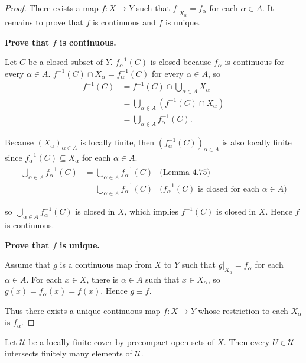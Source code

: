 \begin{proof}
	There exists a map $f: X\to Y$ such that $f\vert_{X_{\alpha}} = f_{\alpha}$ for each $\alpha\in A$. It remains to prove that $f$ is continuous and $f$ is unique.

	\textbf{Prove that $f$ is continuous.}

	Let $C$ be a closed subset of $Y$. $f_{\alpha}^{-1}(C)$ is closed  because $f_{\alpha}$ is continuous for every $\alpha\in A$. $f^{-1}(C) \cap X_{\alpha} = f_{\alpha}^{-1}(C)$ for every $\alpha\in A$, so
	\begin{align*}
		f^{-1}(C) & = f^{-1}(C) \cap \bigcup_{\alpha\in A}X_{\alpha}   \\
		          & = \bigcup_{\alpha\in A} (f^{-1}(C)\cap X_{\alpha}) \\
		          & = \bigcup_{\alpha\in A} f_{\alpha}^{-1}(C).
	\end{align*}

	Because ${(X_{\alpha})}_{\alpha\in A}$ is locally finite, then ${(f_{\alpha}^{-1}(C))}_{\alpha\in A}$ is also locally finite since $f_{\alpha}^{-1}(C) \subseteq X_{\alpha}$ for each $\alpha\in A$.
	\begin{align*}
		\overline{\bigcup_{\alpha\in A} f_{\alpha}^{-1}(C)} & = \bigcup_{\alpha\in A} \overline{f_{\alpha}^{-1}(C)} & \text{(Lemma 4.75)}                                            \\
		                                                    & = \bigcup_{\alpha\in A} f_{\alpha}^{-1}(C)            & \text{($f_{\alpha}^{-1}(C)$ is closed for each $\alpha\in A$)}
	\end{align*}

	so $\bigcup_{\alpha\in A} f_{\alpha}^{-1}(C)$ is closed in $X$, which implies $f^{-1}(C)$ is closed in $X$. Hence $f$ is continuous.

	\textbf{Prove that $f$ is unique.}

	Assume that $g$ is a continuous map from $X$ to $Y$ such that $g\vert_{X_{\alpha}} = f_{\alpha}$ for each $\alpha\in A$. For each $x\in X$, there is $\alpha\in A$ such that $x\in X_{\alpha}$, so $g(x) = f_{\alpha}(x) = f(x)$. Hence $g \equiv f$.

	Thus there exists a unique continuous map $f: X\to Y$ whose restriction to each $X_{\alpha}$ is $f_{\alpha}$.
\end{proof}

\begin{note}\label{note:star-finite-locally-finite-cover-by-precompact-open-sets}
	Let $\mathcal{U}$ be a locally finite cover by precompact open sets of $X$. Then every $U\in\mathcal{U}$ intersects finitely many elements of $\mathcal{U}$.
\end{note}


